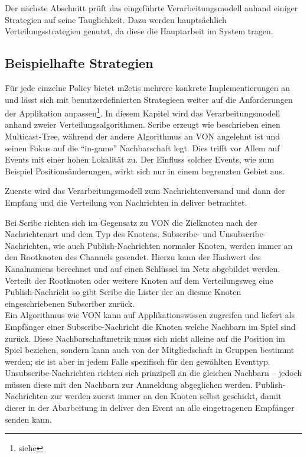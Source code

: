 Der nächste Abschnitt prüft das eingeführte Verarbeitungsmodell anhand einiger Strategien auf seine Tauglichkeit. Dazu werden hauptsächlich Verteilungsstrategien genutzt, da diese die Hauptarbeit im System tragen.

\subsection*{Beispielhafte Strategien}
Für jede einzelne Policy bietet \ac{m2etis} mehrere konkrete Implementierungen an und lässt sich mit benutzerdefinierten Strategieen weiter auf die Anforderungen der Applikation anpassen\footnote{siehe }. In diesem Kapitel wird das Verarbeitungsmodell anhand zweier Verteilungsalgorithmen. Scribe \cite{Castro2002Scribe} erzeugt wie beschrieben einen Multicast-Tree, während der andere Algorithmus an VON \cite{Hu2006VON} angelehnt ist und seinen Fokus auf die ``in-game'' Nachbarschaft legt. Dies trifft vor Allem auf Events mit einer hohen Lokalität zu. Der Einfluss solcher Events, wie zum Beispiel Positionsänderungen, wirkt sich nur in einem begrenzten Gebiet aus.

Zuerste wird das Verarbeitungsmodell zum Nachrichtenversand und dann der Empfang und die Verteilung von Nachrichten in deliver betrachtet.

Bei Scribe richten sich im Gegensatz zu VON die Zielknoten nach der Nachrichtenart und dem Typ des Knotens. Subscribe- und Unsubscribe-Nachrichten, wie auch Publish-Nachrichten normaler Knoten, werden immer an den Rootknoten des Channels gesendet. Hierzu kann der Hashwert des Kanalnamens berechnet und auf einen Schlüssel im Netz abgebildet werden. Verteilt der Rootknoten oder weitere Knoten auf dem Verteilungsweg eine Publish-Nachricht so gibt Scribe die Lister der an diesme Knoten eingeschriebenen Subscriber zurück.\\
Ein Algorithmus wie VON kann auf Applikationswissen zugreifen und liefert als Empfänger einer Subscribe-Nachricht die Knoten welche Nachbarn im Spiel sind zurück. Diese Nachbarschaftmetrik muss sich nicht alleine auf die Position im Spiel beziehen, sondern kann auch von der Mitgliedschaft in Gruppen bestimmt werden; sie ist aber in jedem Falle spezifisch für den gewählten Eventtyp. Unsubscribe-Nachrichten richten sich prinzipell an die gleichen Nachbarn -- jedoch müssen diese mit den Nachbarn zur Anmeldung abgeglichen werden. Publish-Nachrichten zur werden zuerst immer an den Knoten selbst geschickt, damit dieser in der Abarbeitung in deliver den Event an alle eingetragenen Empfänger senden kann.

